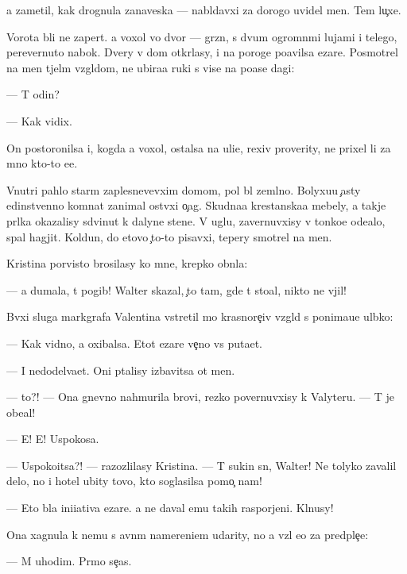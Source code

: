 \documentclass[10pt]{book}
\begin{document}
{\Y}a zametil, kak drognula zanaveska — nabl{\iu}davxi{\y} za dorogo{\y} uvidel men{\ia}. Tem lu{\c}xe.

Vorota b{\yi}li ne zapert{\yi}. {\Y}a  voxol vo dvor — gr{\ia}zn{\yi}{\y}, s dvum{\ia} ogromn{\yi}mi lujami i telego{\y}, perevernuto{\y} nabok. Dvery v dom otkr{\yi}lasy, i na poroge po{\y}avilsa {\C}ezare. Posmotrel na men{\ia} t{\ia}jel{\yi}m vzgl{\ia}dom, ne ubira{\y}a ruki s vis{\ia}{\x}e{\y} na po{\y}ase dagi:

— T{\yi} odin?

— Kak vidix.

On postoronilsa i, kogda {\y}a  voxol, ostalsa na uli{\q}e, rexiv proverity, ne prixel li za mno{\y} kto-to {\y}e{\x}e.

Vnutri pahlo star{\yi}m zaplesnevevxim domom, pol b{\yi}l zeml{\ia}no{\y}. Bolyxu{\y}u {\c}asty {\y}edinstvenno{\y} komnat{\yi} zanimal ost{\yi}vxi{\y} o{\c}ag. Skudna{\y}a krest{\y}anska{\y}a mebely, a takje pr{\ia}lka okazalisy sdvinut{\yi} k dalyne{\y} stene. V uglu, zavernuvxisy v tonko{\y}e ode{\y}alo, spal hagjit. Koldun, do etovo {\c}to-to pisavxi{\y}, tepery smotrel na men{\ia}.

Kristina por{\yi}visto brosilasy ko mne, krepko obn{\ia}la:

— {\Y}a dumala, t{\yi} pogib! Walter skazal, {\c}to tam, gde t{\yi} sto{\y}al, nikto ne v{\yi}jil!

B{\yi}vxi{\y} sluga markgrafa Valentina vstretil mo{\y} krasnore{\c}iv{\yi}{\y} vzgl{\ia}d s ponima{\y}u{\x}e{\y} ul{\yi}bko{\y}:

— Kak vidno, {\y}a oxibalsa. Etot {\C}ezare ve{\c}no vs{\e} puta{\y}et.

— I nedodel{\yi}va{\y}et. Oni p{\yi}talisy izbavitsa ot men{\ia}.

— {\C}to?! — Ona gnevno nahmurila brovi, rezko povernuvxisy k Valyteru. — T{\yi} je obe{\x}al!

— E{\y}! E{\y}! Uspoko{\y}sa.

— Uspoko{\y}itsa?! — razozlilasy Kristina. — T{\yi} sukin s{\yi}n, Walter! Ne tolyko zavalil delo, no i hotel ubity tovo, kto soglasilsa pomo{\c} nam!

— Eto b{\yi}la ini{\q}iativa {\C}ezare. {\Y}a ne daval {\y}emu takih raspor{\ia}jeni{\y}. Kl{\ia}nusy!

Ona xagnula k nemu s {\y}avn{\yi}m namereni{\y}em udarity, no {\y}a vz{\ia}l {\y}e{\y}o za predple{\c}{\y}e:

— M{\yi} uhodim. Pr{\ia}mo se{\y}{\c}as.
\end{document}
